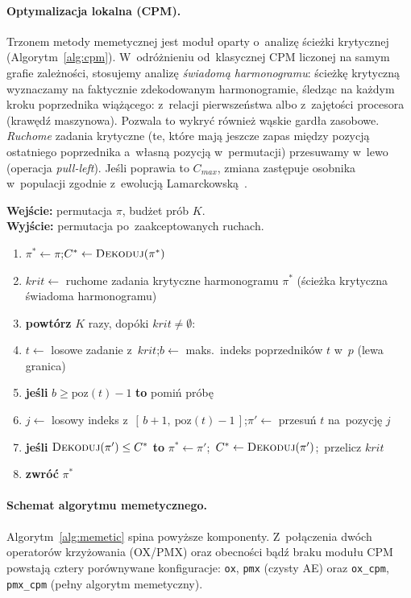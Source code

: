 \documentclass[pdflatex,sn-mathphys,Numbered]{sn-jnl}
\newenvironment{pseudo}
  {\begin{enumerate}[leftmargin=2.6em, itemsep=1pt, topsep=2pt,
     label=\scriptsize\sffamily\arabic*]\small}
  {\end{enumerate}}
\newcommand{\Kw}[1]{\textbf{#1}}%
\newcommand{\In}[1]{\textbf{Wejście:} #1}
\newcommand{\Out}[1]{\textbf{Wyjście:} #1}
\newcommand{\ind}{\hspace*{1.5em}}%
\begin{document}
\paragraph{Optymalizacja lokalna (CPM).}
Trzonem metody memetycznej jest moduł oparty o~analizę ścieżki
krytycznej~\cite{kelley1959} (Algorytm~\ref{alg:cpm}). W~odróżnieniu od~klasycznej
CPM liczonej na samym grafie zależności, stosujemy analizę \emph{świadomą
harmonogramu}: ścieżkę krytyczną wyznaczamy na faktycznie zdekodowanym
harmonogramie, śledząc na każdym kroku poprzednika wiążącego: z~relacji
pierwszeństwa albo z~zajętości procesora (krawędź maszynowa). Pozwala to wykryć
również wąskie gardła zasobowe. \emph{Ruchome} zadania krytyczne (te, które mają
jeszcze zapas między pozycją ostatniego poprzednika a~własną pozycją
w~permutacji) przesuwamy w~lewo (operacja \textit{pull-left}). Jeśli poprawia to
$C_{max}$, zmiana zastępuje osobnika w~populacji zgodnie z~ewolucją
Lamarckowską~\cite{whitley1994}.

\begin{algorithm}[H]
\caption{Lokalne przeszukiwanie CPM (pull-left zadań krytycznych)}
\label{alg:cpm}
\In{permutacja $\pi$, budżet prób $K$.}\\
\Out{permutacja po~zaakceptowanych ruchach.}
\begin{pseudo}
\item $\pi^\ast \gets \pi$;\quad $C^\ast \gets \textsc{Dekoduj}(\pi^\ast)$
\item $\mathit{krit} \gets$ ruchome zadania krytyczne harmonogramu $\pi^\ast$ \quad(ścieżka krytyczna świadoma harmonogramu)
\item \Kw{powtórz} $K$ razy, dopóki $\mathit{krit} \neq \emptyset$:
\item \ind $t \gets$ losowe zadanie z~$\mathit{krit}$;\quad $b \gets$ maks.\ indeks poprzedników $t$ w~$p$ (lewa granica)
\item \ind \Kw{jeśli} $b \ge \mathrm{poz}(t)-1$ \Kw{to} pomiń próbę
\item \ind $j \gets$ losowy indeks z~$[\,b+1,\ \mathrm{poz}(t)-1\,]$;\quad $\pi' \gets$ przesuń $t$ na~pozycję $j$
\item \ind \Kw{jeśli} $\textsc{Dekoduj}(\pi') \le C^\ast$ \Kw{to} $\pi^\ast \gets \pi'$;\ $C^\ast \gets \textsc{Dekoduj}(\pi')$;\ przelicz $\mathit{krit}$
\item \Kw{zwróć} $\pi^\ast$
\end{pseudo}
\end{algorithm}

\paragraph{Schemat algorytmu memetycznego.}
Algorytm~\ref{alg:memetic} spina powyższe komponenty. Z~połączenia dwóch
operatorów krzyżowania (OX/PMX) oraz obecności bądź braku modułu CPM powstają
cztery porównywane konfiguracje: \texttt{ox}, \texttt{pmx} (czysty AE) oraz
\texttt{ox\_cpm}, \texttt{pmx\_cpm} (pełny algorytm memetyczny).
\end{document}
